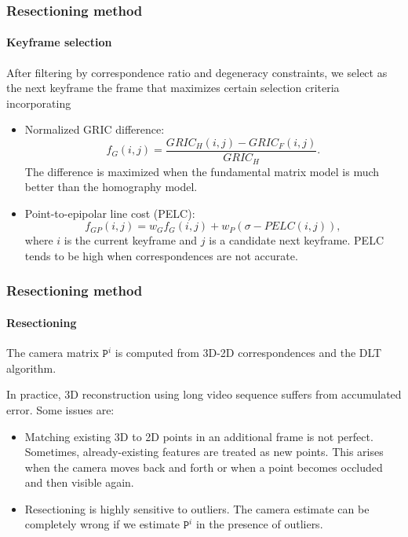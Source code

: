 \documentclass[aspectratio=169]{beamer}
\newcommand{\mat}[1]{\mathtt{#1}}
\begin{document}
\begin{frame}
\frametitle{Resectioning method}
\framesubtitle{Keyframe selection}

After filtering by correspondence ratio and degeneracy constraints, we
select as the next keyframe the frame that maximizes certain selection
criteria incorporating
\begin{itemize}
\item \alert{Normalized GRIC difference}:
  $$f_{G}(i,j) = \dfrac{GRIC_{H}(i,j) - GRIC_{F}(i,j)}{GRIC_{H}}.$$
  The difference is maximized when the fundamental matrix model is
  much better than the homography model.
\item \alert{Point-to-epipolar line cost (PELC)}:
  $$f_{GP}(i,j) = w_{G}f_{G}(i,j) + w_{P}(\sigma - PELC(i,j)),$$
  where $i$ is the current keyframe and $j$ is a candidate next
  keyframe.  PELC tends to be high when correspondences are not
  accurate.
\end{itemize}

\end{frame}


\begin{frame}
\frametitle{Resectioning method}
\framesubtitle{Resectioning}

The camera matrix $\mat{P}^i$ is computed from 3D-2D correspondences
and the DLT algorithm.

\medskip

In practice, 3D reconstruction using \alert{long} video sequence
suffers from \alert{accumulated error}. Some issues are:
\begin{itemize}
\item \alert{Matching existing 3D to 2D points} in an additional frame
  is not perfect. Sometimes, already-existing features are treated as
  new points. This arises when the camera moves back and forth or when
  a point becomes occluded and then visible again.
\item Resectioning is highly sensitive to \alert{outliers}. The camera
  estimate can be completely wrong if we estimate $\mat{P}^i$ in the
  presence of outliers.
\end{itemize}

\end{frame}
\end{document}
